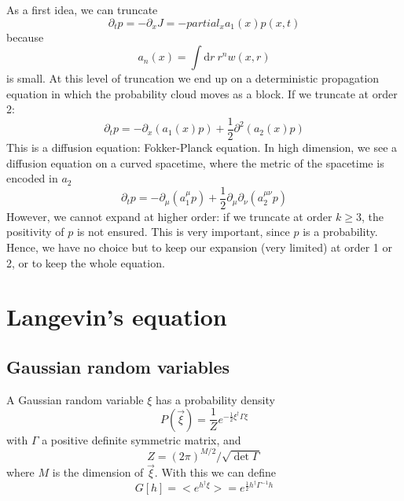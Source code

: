 \documentclass[a4paper]{book}
\theoremstyle{definition}
\theoremstyle{remark}
\begin{document}
As a first idea, we can truncate 
\begin{equation}
    \partial_t p = -\partial_x J = -partial_x a_1(x)p(x, t)
\end{equation}
because 
\begin{equation}
    a_n(x) = \int \text{d}r ~ r^n w(x, r)
\end{equation}
is small. At this level of truncation we end up on a deterministic propagation equation in which the probability cloud moves as a block. If we truncate at order 2:
\begin{equation}
    \partial_t  p = -\partial_x (a_1(x)p) + \frac{1}{2}\partial^2(a_2(x)p)
\end{equation}
This is a diffusion equation: Fokker-Planck equation. In high dimension, we see a diffusion equation on a curved spacetime, where the metric of the spacetime is encoded in $a_2$
\begin{equation}
    \partial_t  p = -\partial_\mu (a_1^\mu p) + \frac{1}{2}\partial_\mu\partial_\nu(a_2^{\mu\nu} p)
\end{equation}
However, we cannot expand at higher order: if we truncate at order $k\geq 3$, the positivity of $p$ is not ensured. This is very important, since $p$ is a probability. Hence, we have no choice but to keep our expansion (very limited) at order 1 or 2, or to keep the whole equation.

\section{Langevin's equation}
\subsection{Gaussian random variables}

A Gaussian random variable $\xi$ has a probability density 
\begin{equation}
    P(\vec{\xi}) = \frac{1}{Z} e^{-\frac{1}{2}\xi^\dagger \Gamma \xi}
\end{equation}
with $\Gamma$ a positive definite symmetric matrix, and 
\begin{equation}
    Z = (2\pi)^{M/2}/\sqrt{\det \Gamma}
\end{equation}
where $M$ is the dimension of $\vec{\xi}$. 
With this we can define 
\begin{equation}
    G[h] = <e^{h^\dagger \xi }> = e^{\frac{1}{2}h^\dagger \Gamma^{-1}h}
\end{equation}
\end{document}
